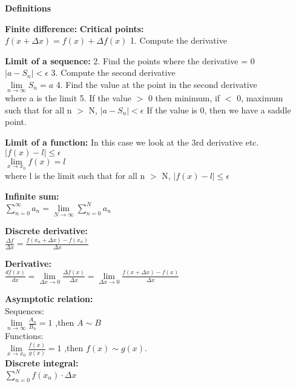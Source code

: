 \documentclass[12pt,a4paper]{report}
\begin{document}
	
	\begin{center}\textbf{Definitions}\end{center}
	
	\textbf{Finite difference:} 									\hfill \textbf{Critical points:}\\
	$f(x + \Delta x) = f(x) + \Delta f(x)$ 							\hfill 1. Compute the derivative

	\textbf{Limit of a sequence:}									\hfill 2. Find the points where the derivative = 0\\
	$|a - S_n| < \epsilon$											\hfill 3. Compute the second derivative\\
	$\lim\limits_{n \to \infty} S_n = a$							\hfill 4. Find the value at the point in the second derivative\\
	where a is the limit											\hfill 5. If the value $>$ 0 then minimum, if $<$ 0, maximum\\
	such that for all n $>$ N, $|a - S_n| < \epsilon$				\hfill If the value is 0, then we have a saddle point.

	\textbf{Limit of a function:}									\hfill In this case we look at the 3rd derivative etc.\\
	$|f(x) - l| \leq \epsilon$\\
	$\lim\limits_{x \to x_0} f(x) = l$\\
	where l is the limit such that for all n $>$ N, $|f(x) - l| \leq \epsilon$
	
	\textbf{Infinite sum:}\\
	$\sum_{n = 0}^{\infty} a_n = \lim\limits_{N \to \infty} \sum_{n = 0}^{N} a_n$
	
	\textbf{Discrete derivative:}\\
	$\frac{\Delta f}{\Delta x} = \frac{f(x_n + \Delta x) - f(x_n)}{\Delta x}$
	
	\textbf{Derivative:}\\
	$\frac{df(x)}{dx} = \lim\limits_{\Delta x \to 0} \frac{\Delta f(x)}{\Delta x} = \lim\limits_{\Delta x \to 0} \frac{f(x + \Delta x) - f(x)}{\Delta x}$
	
	\textbf{Asymptotic relation:}\\
	Sequences:\\
	$\lim\limits_{n \to \infty} \frac{A_n}{B_n} = 1$ ,then $A \sim B$\\
	Functions:\\
	$\lim\limits_{x \to x_0} \frac{f(x)}{g(x)} = 1$ ,then $f(x) \sim g(x).$\\
	
	\textbf{Discrete integral:}\\
	$\sum_{n = 0}^{N} f(x_n) \cdot \Delta x$
	
\end{document}
